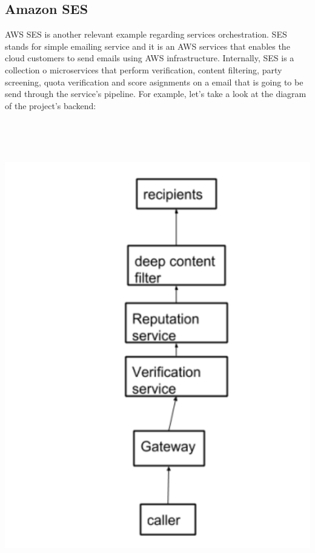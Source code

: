 \documentclass[12pt, oneside]{article}
\begin{document}
\subsection{Amazon SES}
AWS SES is another relevant example regarding services orchestration. SES stands for
simple emailing service and it is an AWS services that enables the cloud customers to send
emails using AWS infrastructure.
Internally, SES is a collection o microservices that perform verification, content filtering, party
screening, quota verification and score asignments on a email that is going to be send
through the service’s pipeline.
For example, let’s take a look at the diagram of the project’s backend:

\includegraphics[width=15cm,height=20.5cm,keepaspectratio]{Capture.png} \\
\end{document}
